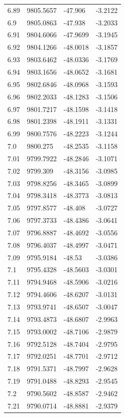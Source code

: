 \begin{table}[H]
\begin{tabular}{llll}
6.89 & 9805.5657 & -47.906 & -3.2122 \\
6.9 & 9805.0863 & -47.938 & -3.2033 \\
6.91 & 9804.6066 & -47.9699 & -3.1945 \\
6.92 & 9804.1266 & -48.0018 & -3.1857 \\
6.93 & 9803.6462 & -48.0336 & -3.1769 \\
6.94 & 9803.1656 & -48.0652 & -3.1681 \\
6.95 & 9802.6846 & -48.0968 & -3.1593 \\
6.96 & 9802.2033 & -48.1283 & -3.1506 \\
6.97 & 9801.7217 & -48.1598 & -3.1418 \\
6.98 & 9801.2398 & -48.1911 & -3.1331 \\
6.99 & 9800.7576 & -48.2223 & -3.1244 \\
7.0 & 9800.275 & -48.2535 & -3.1158 \\
7.01 & 9799.7922 & -48.2846 & -3.1071 \\
7.02 & 9799.309 & -48.3156 & -3.0985 \\
7.03 & 9798.8256 & -48.3465 & -3.0899 \\
7.04 & 9798.3418 & -48.3773 & -3.0813 \\
7.05 & 9797.8577 & -48.408 & -3.0727 \\
7.06 & 9797.3733 & -48.4386 & -3.0641 \\
7.07 & 9796.8887 & -48.4692 & -3.0556 \\
7.08 & 9796.4037 & -48.4997 & -3.0471 \\
7.09 & 9795.9184 & -48.53 & -3.0386 \\
7.1 & 9795.4328 & -48.5603 & -3.0301 \\
7.11 & 9794.9468 & -48.5906 & -3.0216 \\
7.12 & 9794.4606 & -48.6207 & -3.0131 \\
7.13 & 9793.9741 & -48.6507 & -3.0047 \\
7.14 & 9793.4873 & -48.6807 & -2.9963 \\
7.15 & 9793.0002 & -48.7106 & -2.9879 \\
7.16 & 9792.5128 & -48.7404 & -2.9795 \\
7.17 & 9792.0251 & -48.7701 & -2.9712 \\
7.18 & 9791.5371 & -48.7997 & -2.9628 \\
7.19 & 9791.0488 & -48.8293 & -2.9545 \\
7.2 & 9790.5602 & -48.8587 & -2.9462 \\
7.21 & 9790.0714 & -48.8881 & -2.9379 \\

\end{tabular}
\end{table}
